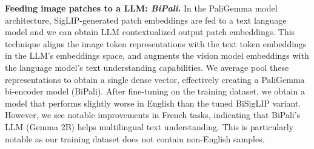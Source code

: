 
\noindent\textbf{Feeding image patches to a LLM: \textit{BiPali}.} In the PaliGemma model architecture, SigLIP-generated patch embeddings are fed to a text language model and we can obtain LLM contextualized output patch embeddings. This technique aligns the image token representations with the text token embeddings in the LLM's embeddings space, and augments the vision model embeddings with the language model's text understanding capabilities. We average pool these representations to obtain a single dense vector, effectively creating a PaliGemma bi-encoder model (BiPali). After fine-tuning on the training dataset, we obtain a model that performs slightly worse in English than the tuned BiSigLIP variant. However, we see notable improvements in French tasks, indicating that BiPali's LLM (Gemma 2B) helps multilingual text understanding. This is particularly notable as our training dataset does not contain non-English samples.

